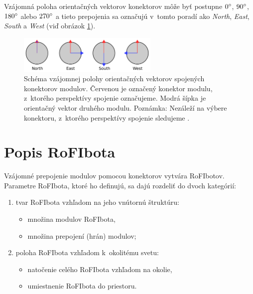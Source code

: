 \documentclass[
  printed, %
  oneside, %
  notable,   %
  nolof,     %
  nolot,     %
]{fithesis3}
\begin{document}
Vzájomná poloha orientačných vektorov konektorov môže byť postupne $0\degree$, $90\degree$, $180\degree$ alebo $270\degree$ a tieto prepojenia sa označujú v~tomto poradí ako \textit{North}, \textit{East}, \textit{South} a \textit{West} (viď obrázok \ref{fig:dock_orientation}). 

\begin{figure}[hbt!]
    \centering
    \includegraphics[width=0.6\textwidth]{pictures/dock_orientation.pdf}
    \caption[Možné spôsoby prepojenia konektorov modulu]{Schéma vzájomnej polohy orientačných vektorov spojených konektorov modulov. Červenou je označený konektor modulu, z~ktorého perspektívy spojenie označujeme. Modrá šípka je orientačný vektor druhého modulu. Poznámka: Nezáleží na výbere konektoru, z~ktorého perspektívy spojenie sledujeme \cite{mrazekMasterThesis}.}
    \label{fig:dock_orientation}
\end{figure}

\section{Popis RoFIbota}
\label{sec:rofibotSpec}
Vzájomné prepojenie modulov pomocou konektorov vytvára RoFIbotov. Parametre RoFIbota, ktoré ho definujú, sa dajú rozdeliť do dvoch kategórií:   
\begin{enumerate}
    \item tvar RoFIbota vzhľadom na jeho vnútornú štruktúru:
    \begin{itemize}[topsep=-5pt]
        \item množina modulov RoFIbota, 
        \item množina prepojení (hrán) modulov; 
    \end{itemize}
    
    \item poloha RoFIbota vzhľadom k~okolitému svetu: 
    \begin{itemize}[topsep=-5pt]
        \item natočenie celého RoFIbota vzhľadom na okolie, 
        \item umiestnenie RoFIbota do priestoru.  
    \end{itemize}
\end{enumerate}
\end{document}
